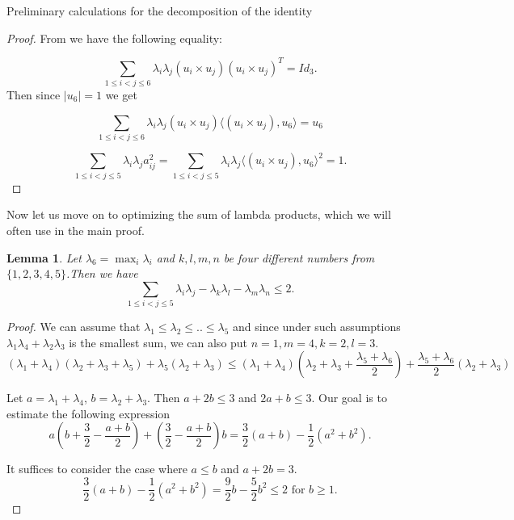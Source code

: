 \documentclass[12pt]{article}
\newtheorem{lemma}{Lemma}[section]
\begin{document}
\begin{section}{Preliminary calculations for the decomposition of the identity }
    \begin{proof}
        From \cite{g-ivanov} we have the following equality:

        $$
            \sum_{1\leq i<j\leq 6}\lambda_{i}\lambda_{j}(u_{i}\times u_{j})(u_{i}\times u_{j})^{T} = Id_{3}.
        $$
        Then since $|u_{6}|=1$ we get

        $$
            \sum_{1\leq i<j\leq 6}\lambda_{i}\lambda_{j}(u_{i}\times u_{j})\langle(u_{i}\times u_{j}), u_{6} \rangle = u_{6}
        $$

        $$
         \sum_{1\leq i<j\leq 5} \lambda_{i}\lambda_{j}a_{ij}^2 = \sum_{1\leq i<j\leq 5}\lambda_{i}\lambda_{j}\langle(u_{i}\times u_{j}), u_{6} \rangle ^{2}= 1.
        $$
        
    \end{proof}
    
    Now let us move on to optimizing the sum of lambda products, which we will often use in the main proof. 
    
   
    \begin{lemma}
    \label{lemma3.3}
        Let $\lambda_{6} = \max_{i}\lambda_{i}$ and $k,l,m,n$ be four different  numbers from $\{1,2,3,4,5\}$.Then we have 
        $$
            \sum_{1\leq i<j\leq 5}\lambda_{i}\lambda_{j} - \lambda_{k}\lambda_{l} - \lambda_{m}\lambda_{n}\leq 2.
        $$
    \end{lemma}
    
    \begin{proof}
        We can assume that $\lambda_{1}\leq \lambda_{2}\leq .. \leq \lambda_{5}$ and since under such  assumptions $\lambda_{1}\lambda_{4} + \lambda_{2}\lambda_{3}$ is the smallest sum, we can also put $n=1,m=4,k=2,l=3$. 
         $$
            (\lambda_{1} + \lambda_{4})(\lambda_{2}+\lambda_{3} + \lambda_{5}) + \lambda_{5}(\lambda_{2} + \lambda_{3}) \leq (\lambda_{1} + \lambda_{4})\left(\lambda_{2}+\lambda_{3} + \frac{\lambda_{5}+\lambda_{6}}{2}\right) + \frac{\lambda_{5}+\lambda_{6}}{2}(\lambda_{2} + \lambda_{3})  
    $$

    Let $a = \lambda_{1} + \lambda_{4}$, $b = \lambda_{2} + \lambda_{3}$. Then $a+2b\leq 3$ and $2a+b\leq 3$. Our goal is to estimate the following expression
    $$
        a\left(b+\frac{3}{2} - \frac{a+b}{2}\right) + \left(\frac{3}{2} - \frac{a+b}{2}\right)b = \frac{3}{2}(a+b) - \frac{1}{2}(a^{2}+b^{2}).
    $$

    It suffices to consider the case where $a\leq b$ and $a+2b = 3$.  
    $$
        \frac{3}{2}(a+b) - \frac{1}{2}(a^{2}+b^{2}) = \frac{9}{2}b - \frac{5}{2}b^2\leq 2 \text{ for $b\geq 1$.}
    $$
    \end{proof}
    

\end{section}
\end{document}
